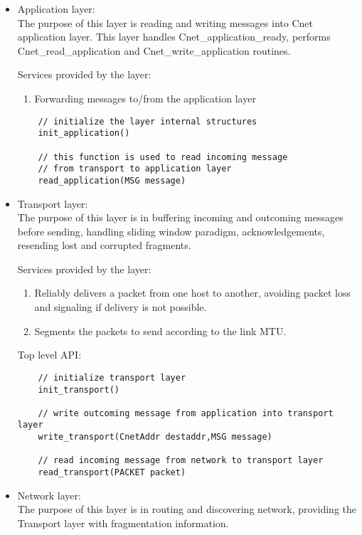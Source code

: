 \documentclass{article}
\begin{document}
\begin{itemize}
  \item Application layer: \\
		The purpose of this layer is reading and writing messages into Cnet
		application layer. This layer handles Cnet\_application\_ready, performs
		Cnet\_read\_application and Cnet\_write\_application routines.
		
		Services provided by the layer:
		\begin{enumerate}
		  \item Forwarding messages to/from the application layer 
		\end{enumerate}
	
	\begin{verbatim}
    // initialize the layer internal structures
    init_application()
		
    // this function is used to read incoming message 
    // from transport to application layer
    read_application(MSG message) 
	\end{verbatim}
		
\item	Transport layer: \\
		The purpose of this layer is in buffering incoming and outcoming messages
		before sending, handling sliding window paradigm, acknowledgements, resending
		lost and corrupted fragments.
		
		Services provided by the layer:
    \begin{enumerate}
      \item Reliably delivers a packet from one host to another, avoiding packet
      loss and signaling if delivery is not possible.
      \item Segments the packets to send according to the link MTU.
    \end{enumerate}
		
		Top level API:
  \begin{verbatim}
    // initialize transport layer
    init_transport()
	
    // write outcoming message from application into transport layer
    write_transport(CnetAddr destaddr,MSG message) 
		
    // read incoming message from network to transport layer
    read_transport(PACKET packet)
  \end{verbatim}
		
		
\item Network layer: \\
		The purpose of this layer is in routing and discovering network, providing the
		Transport layer with fragmentation information.
		

\end{itemize}
\end{document}

